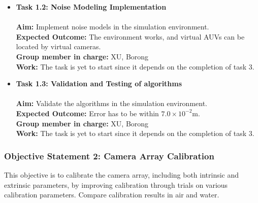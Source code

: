 \documentclass[11pt]{article}
\begin{document}
\begin{itemize}
            
            \item \textbf{Task 1.2: Noise Modeling Implementation}\\\\
            \textbf{Aim:} Implement noise models in the simulation environment.\\
            \textbf{Expected Outcome:} The environment works, and virtual AUVs can be located by virtual cameras.\\
            \textbf{Group member in charge:} XU, Borong\\
            \textbf{Work:} The task is yet to start since it depends on the completion of task 3.
            
            \item \textbf{Task 1.3: Validation and Testing of algorithms}\\\\
            \textbf{Aim:} Validate the algorithms in the simulation environment.\\
            \textbf{Expected Outcome:} Error has to be within $7.0\times10^{-2}$m.\\
            \textbf{Group member in charge:} XU, Borong\\
            \textbf{Work:} The task is yet to start since it depends on the completion of task 3.
        \end{itemize}
        
        \subsubsection{Objective Statement 2: Camera Array Calibration}
        This objective is to calibrate the camera array, including both intrinsic and extrinsic parameters, by improving calibration through trials on various calibration parameters. Compare calibration results in air and water.
        
\end{document}

